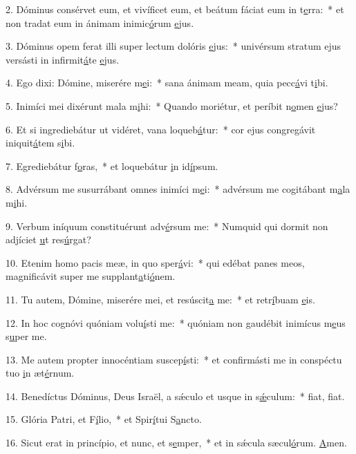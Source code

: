 2. Dóminus consérvet eum, et vivíficet eum, et beátum fáciat eum in t\uline{e}rra:~* et non tradat eum in ánimam inimic\uline{ó}rum \uline{e}jus.\par 
3. Dóminus opem ferat illi super lectum dolóris \uline{e}jus:~* univérsum stratum ejus versásti in infirmit\uline{á}te \uline{e}jus.\par 
4. Ego dixi: Dómine, miserére m\uline{e}i:~* sana ánimam meam, quia pecc\uline{á}vi t\uline{i}bi.\par 
5. Inimíci mei dixérunt mala m\uline{i}hi:~* Quando moriétur, et períbit n\uline{o}men \uline{e}jus?\par 
6. Et si ingrediebátur ut vidéret, vana loqueb\uline{á}tur:~* cor ejus congregávit iniquit\uline{á}tem s\uline{i}bi.\par 
7. Egrediebátur f\uline{o}ras,~* et loquebátur \uline{i}n id\uline{í}psum.\par 
8. Advérsum me susurrábant omnes inimíci m\uline{e}i:~* advérsum me cogitábant m\uline{a}la m\uline{i}hi.\par 
9. Verbum iníquum constituérunt adv\uline{é}rsum me:~* Numquid qui dormit non adjíciet \uline{u}t res\uline{ú}rgat?\par 
10. Etenim homo pacis meæ, in quo sper\uline{á}vi:~* qui edébat panes meos, magnificávit super me supplant\uline{a}ti\uline{ó}nem.\par 
11. Tu autem, Dómine, miserére mei, et resúscit\uline{a} me:~* et retr\uline{í}buam \uline{e}is.\par 
12. In hoc cognóvi quóniam volu\uline{í}sti me:~* quóniam non gaudébit inimícus m\uline{e}us s\uline{u}per me.\par 
13. Me autem propter innocéntiam suscep\uline{í}sti:~* et confirmásti me in conspéctu tuo \uline{i}n æt\uline{é}rnum.\par 
14. Benedíctus Dóminus, Deus Israël, a sǽculo et usque in s\uline{ǽ}culum:~* f\uline{i}at, f\uline{i}at.\par 
15. Glória Patri, et F\uline{í}lio,~* et Spir\uline{í}tui S\uline{a}ncto.\par 
16. Sicut erat in princípio, et nunc, et s\uline{e}mper,~* et in sǽcula sæcul\uline{ó}rum. \uline{A}men.\par 
